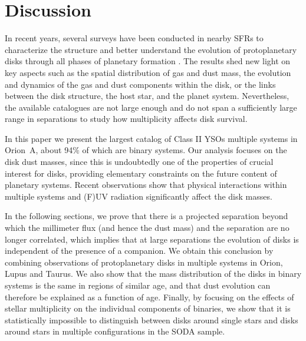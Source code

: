 \documentclass{aa}
\begin{document}
\section{Discussion} \label{section4}
In recent years, several surveys have been conducted in nearby SFRs to characterize the structure and better understand the evolution of protoplanetary disks through all phases of planetary formation \citep[e.g.,][]{Tobin_2022, van_Terwisga_2022, Zurlo21, Manara19}. The results shed new light on key aspects such as the spatial distribution of gas and dust mass, the evolution and dynamics of the gas and dust components within the disk, or the links between the disk structure, the host star, and the planet system. Nevertheless, the available catalogues are not large enough and do not span a sufficiently large range in separations to study how multiplicity affects disk survival. \par
In this paper we present the largest catalog of Class II YSOs multiple systems in Orion~A, about 94$\%$ of which are binary systems. Our analysis focuses on the disk dust masses, since this is undoubtedly one of the properties of crucial interest for disks, providing elementary constraints on the future content of planetary systems. 
Recent observations show that physical interactions within multiple systems \citep[e.g.,][]{Zagaria21, Manara19, Cox17} and (F)UV radiation \citep[e.g.,][]{VanTerwisga23, Winter22} significantly affect the disk masses. \par
In the following sections, we prove that there is a projected separation beyond which the millimeter flux (and hence the dust mass) and the separation are no longer correlated, which implies that at large separations the evolution of disks is independent of the presence of a companion. We obtain this conclusion by combining observations of protoplanetary disks in multiple systems in Orion, Lupus and Taurus. We also show that the mass distribution of the disks in binary systems is the same in regions of similar age, and that dust evolution can therefore be explained as a function of age. Finally, by focusing on the effects of stellar multiplicity on the individual components of binaries, we show that it is statistically impossible to distinguish between disks around single stars and disks around stars in multiple configurations in the SODA sample.
\end{document}
